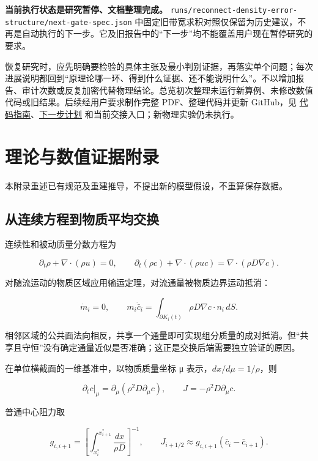 \documentclass[
  10pt,
  a4paper,
]{article}
\begin{document}
\textbf{当前执行状态是研究暂停、文档整理完成。}
\nolinkurl{runs/reconnect-density-error-structure/next-gate-spec.json}
中固定旧带宽求积对照仅保留为历史建议，不再是自动执行的下一步。它及旧报告中的``下一步''均不能覆盖用户现在暂停研究的要求。

恢复研究时，应先明确要检验的具体主张及最小判别证据，再落实单个问题；每次进展说明都回到``原理论哪一环、得到什么证据、还不能说明什么''。不以增加报告、审计次数或反复加密代替物理结论。总览初次整理未运行新算例、未修改数值代码或旧结果。后续经用户要求制作完整
PDF、整理代码并更新 GitHub，见
\href{https://github.com/hongjianli97/diffuse-mixing/blob/main/docs/CODE_GUIDE.md}{代码指南}、\href{https://github.com/hongjianli97/diffuse-mixing/blob/main/docs/NEXT_STEPS.md}{下一步计划}
和当前交接入口；新物理实验仍未执行。

\newpage

\section{理论与数值证据附录}\label{ux7406ux8bbaux4e0eux6570ux503cux8bc1ux636eux9644ux5f55}

本附录重述已有规范及重建推导，不提出新的模型假设，不重算保存数据。

\subsection{从连续方程到物质平均交换}\label{ux4eceux8fdeux7eedux65b9ux7a0bux5230ux7269ux8d28ux5e73ux5747ux4ea4ux6362}

连续性和被动质量分数方程为

\[
\partial_t\rho+\nabla\cdot(\rho u)=0,\qquad
\partial_t(\rho c)+\nabla\cdot(\rho u c)=\nabla\cdot(\rho D\nabla c).
\]

对随流运动的物质区域应用输运定理，对流通量被物质边界运动抵消：

\[
\dot m_i=0,\qquad
m_i\dot{\bar c}_i=\int_{\partial K_i(t)}\rho D\nabla c\cdot n_i\,dS.
\]

相邻区域的公共面法向相反，共享一个通量即可实现组分质量的成对抵消。但``共享且守恒''没有确定通量近似是否准确；这正是交换后端需要独立验证的原因。

在单位横截面的一维基准中，以物质质量坐标 μ 表示，\(dx/d\mu=1/\rho\)，则

\[
\left.\partial_t c\right|_\mu=\partial_\mu(\rho^2D\partial_\mu c),\qquad
J=-\rho^2D\partial_\mu c.
\]

普通中心阻力取

\[
g_{i,i+1}=\left[\int_{x_i^*}^{x_{i+1}^*}\frac{dx}{\rho D}\right]^{-1},\qquad
J_{i+1/2}\approx g_{i,i+1}(\bar c_i-\bar c_{i+1}).
\]
\end{document}
